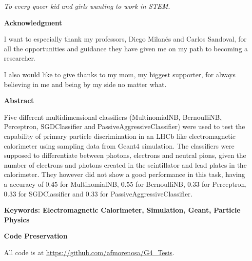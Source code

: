 \begin{flushright}
\begin{minipage}{8cm}
    \noindent
        \small
        \textit{To every queer kid and girls wanting to work in STEM.}
\end{minipage}
\end{flushright}

\newpage{\pagestyle{empty}}

\newpage
\thispagestyle{empty} \textbf{}\normalsize


\textbf{\LARGE Acknowledgment}

I want to especially thank my professors, Diego Milanés and Carlos Sandoval,
for all the opportunities and guidance they have given me on my path to
becoming a researcher.

I also would like to give thanks to my mom, my biggest supporter, for always
believing in me and being by my side no matter what.

\newpage{\pagestyle{empty}\cleardoublepage}

\newpage
\textbf{\LARGE Abstract}


Five different multidimensional classifiers (MultinomialNB, BernoulliNB,
Perceptron, SGDClassifier and PassiveAggressiveClassifier) were used to test
the capability of primary particle discrimination in an LHCb like
electromagnetic calorimeter using sampling data from Geant4 simulation. The
classifiers were supposed to differentiate between photons, electrons and
neutral pions, given the number of electrons and photons created in the
scintillator and lead plates in the calorimeter. They however did not show a
good performance in this task, having a accuracy of 0.45 for MultinomialNB,
0.55 for BernoulliNB, 0.33 for Perceptron, 0.33 for SGDClassifier and 0.33 for
PassiveAggressiveClassifier.

\textbf{\small Keywords: Electromagnetic Calorimeter, Simulation, Geant, Particle Physics}\\

\newpage{}

\textbf{\LARGE Code Preservation}

All code is at \url{https://github.com/afmorenosa/G4_Tesis}.
